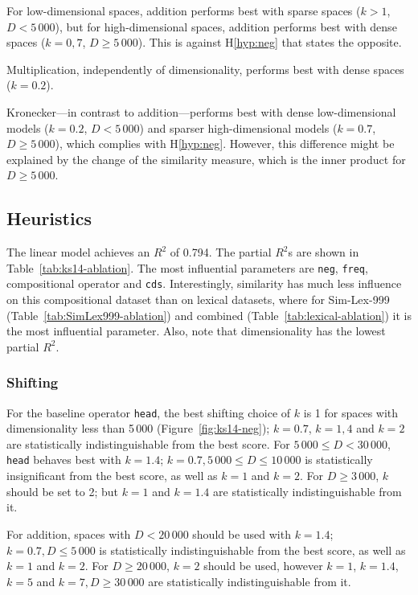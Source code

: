 For low-dimensional spaces, addition performs best with sparse spaces ($k > 1$, $D < 5\,000$), but for high-dimensional spaces, addition performs best  with dense spaces ($k = 0,7$, $D \geq 5\,000$). This is against H\ref{hyp:neg} that states the opposite.

Multiplication, independently of dimensionality, performs best with dense spaces ($k = 0.2$).

Kronecker---in contrast to addition---performs best with dense low-dimensional models ($k = 0.2$, $D < 5\,000$) and sparser high-dimensional models ($k = 0.7$, $D \geq 5\,000$), which complies with H\ref{hyp:neg}. However, this difference might be explained by the change of the similarity measure, which is the inner product for $D \geq 5\,000$.

\subsection{Heuristics}
\label{sec:heuristics}



The linear model achieves an $R^2$ of 0.794. The partial $R^2$s are shown in Table~\ref{tab:ks14-ablation}. The most influential parameters are \texttt{neg}, \texttt{freq}, compositional operator and \texttt{cds}. Interestingly, similarity has much less influence on this compositional dataset than on lexical datasets, where for Sim-Lex-999 (Table~\ref{tab:SimLex999-ablation}) and combined (Table~\ref{tab:lexical-ablation}) it is the most influential parameter. Also, note that dimensionality has the lowest partial $R^2$.

\subsubsection{Shifting}

For the baseline operator \texttt{head}, the best shifting choice of $k$ is 1 for spaces with dimensionality less than 5\,000 (Figure~\ref{fig:ks14-neg}); $k=0.7$, $k=1,4$ and $k=2$ are statistically indistinguishable from the best score. For $5\,000 \leq D < 30\,000$, \texttt{head} behaves best with $k = 1.4$; $k=0.7, 5\,000 \le D \le 10\,000$ is statistically insignificant from the best score, as well as $k=1$ and $k=2$. For $D \geq 3\,000$, $k$ should be set to 2; but $k=1$ and $k=1.4$ are statistically indistinguishable from it.

For addition, spaces with $D < 20\,000$ should be used with $k = 1.4$; $k=0.7, D \le 5\,000$ is statistically indistinguishable from the best score, as well as $k=1$ and $k=2$. For $D \ge 20\,000$, $k = 2$ should be used, however $k=1$, $k=1.4$, $k=5$ and $k=7, D \ge 30\,000$ are statistically indistinguishable from it.

